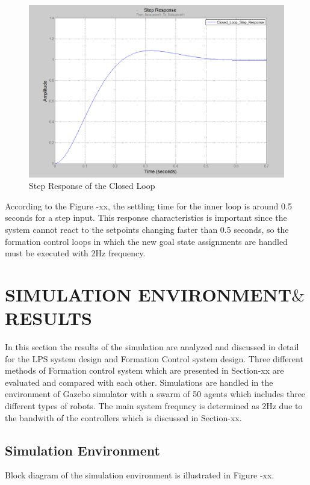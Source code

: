 \documentclass[twoside]{article}
\begin{document}
	\begin{figure}[H]
		\caption{Step Response of the Closed Loop}
		\centering
		\includegraphics[scale = 0.50]{step_resp}
	\end{figure}

According to the Figure -xx, the settling time for the inner loop is around 0.5 seconds for a step input. This response characteristics is important since the system cannot react to the setpoints changing faster than 0.5 seconds, so the formation control loops in which the new goal state assignments are handled must be executed with 2Hz frequency. 


\section{SIMULATION ENVIRONMENT$\&$RESULTS}	
	
	In this section the results of the simulation are analyzed and discussed in detail for the LPS system design and Formation Control system design. Three different methods of Formation control system which are presented in Section-xx are evaluated and compared with each other. Simulations are handled in the environment of Gazebo simulator with a swarm of 50 agents which includes three different types of robots. The main system frequncy is determined as 2Hz due to the bandwith of the controllers which is discussed in Section-xx. 
	\subsection{Simulation Environment}
    Block diagram of the simulation environment is illustrated in Figure -xx.
    
\end{document}
